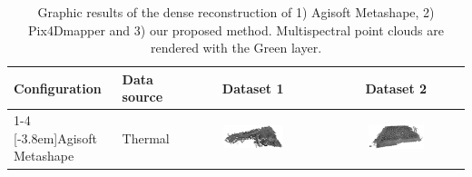 \begin{table}[hb]
    \centering
    \caption{Graphic results of the dense reconstruction of 1) Agisoft Metashape, 2) Pix4Dmapper and 3) our proposed method. Multispectral point clouds are rendered with the Green layer. }
    \label{table:visual_results}  
    \newcommand\imageTableSize{0.44\textwidth}
    \begin{tabular}{l|l|c|c}
    \toprule
    \textbf{Configuration} & \textbf{Data source} &\textbf{Dataset 1} & \textbf{Dataset 2}\\
    \cmidrule{1-4}
    \multirow{2}{*}[-3.8em]{Agisoft Metashape} & Thermal & \multicolumn{1}{m{\imageTableSize}|}{\includegraphics[width=\imageTableSize]{figs/multi_thermal_projection/results/metashape/AgisoftThermalMarmolejo.png}} & \multicolumn{1}{m{\imageTableSize}}{\includegraphics[width=\imageTableSize]{figs/multi_thermal_projection/results/metashape/AgisoftThermalNovember.png}}\\

\end{tabular}
\end{table}

